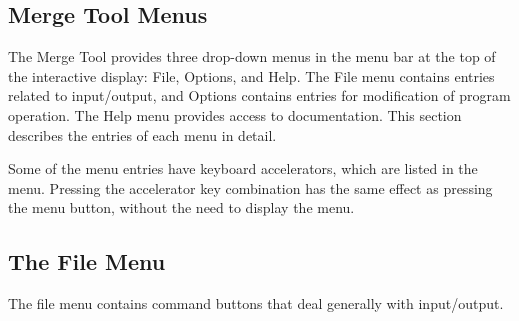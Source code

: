 \subsection{Merge Tool Menus}

The {\cb Merge Tool} provides three drop-down menus in the menu bar at
the top of the interactive display:  {\cb File}, {\cb Options}, and
{\cb Help}.  The {\cb File} menu contains entries related to
input/output, and {\cb Options} contains entries for modification of
program operation.  The {\cb Help} menu provides access to
documentation.  This section describes the entries of each menu in
detail.

Some of the menu entries have keyboard accelerators, which are listed
in the menu.  Pressing the accelerator key combination has the same
effect as pressing the menu button, without the need to display the
menu.

\subsection{The File Menu}

The file menu contains command buttons that deal generally with
input/output.

